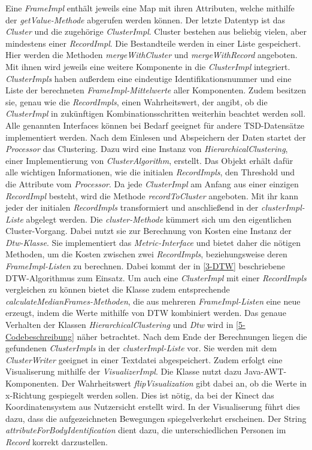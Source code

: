 Eine \emph{FrameImpl} enthält jeweils eine Map mit ihren Attributen,
welche mithilfe der \emph{getValue-Methode} abgerufen werden können.
Der letzte Datentyp ist das \emph{Cluster} und die zugehörige \emph{ClusterImpl}.
Cluster bestehen aus beliebig vielen, aber mindestens einer \emph{RecordImpl}.
Die Bestandteile werden in einer Liste gespeichert.
Hier werden die Methoden \emph{mergeWithCluster} und \emph{mergeWithRecord} angeboten.
Mit ihnen wird jeweils eine weitere Komponente in die \emph{ClusterImpl} integriert.
\emph{ClusterImpls} haben außerdem eine eindeutige Identifikationsnummer und eine Liste der berechneten
\emph{FrameImpl-Mittelwerte} aller Komponenten.
Zudem besitzen sie, genau wie die \emph{RecordImpls}, einen Wahrheitswert, der angibt,
ob die \emph{ClusterImpl} in zukünftigen Kombinationsschritten weiterhin beachtet werden soll.
Alle genannten Interfaces können bei Bedarf geeignet für andere \ac{TSD}-Datensätze implementiert werden.
Nach dem Einlesen und Abspeichern der Daten startet der \emph{Processor} das Clustering.
Dazu wird eine Instanz von \emph{HierarchicalClustering}, einer Implementierung von \emph{ClusterAlgorithm}, erstellt.
Das Objekt erhält dafür alle wichtigen Informationen,
wie die initialen \emph{RecordImpls}, den Threshold und die Attribute vom \emph{Processor}.
Da jede \emph{ClusterImpl} am Anfang aus einer einzigen \emph{RecordImpl} besteht,
wird die Methode \emph{recordToCluster} angeboten.
Mit ihr kann jeder der initialen \emph{RecordImpls} transformiert
und anschließend in der \emph{clusterImpl-Liste} abgelegt werden.
Die \emph{cluster-Methode} kümmert sich um den eigentlichen Cluster-Vorgang.
Dabei nutzt sie zur Berechnung von Kosten eine Instanz der \emph{Dtw-Klasse}.
Sie implementiert das \emph{Metric-Interface} und bietet daher die nötigen Methoden,
um die Kosten zwischen zwei \emph{RecordImpls}, beziehungsweise deren \emph{FrameImpl-Listen} zu berechnen.
Dabei kommt der in \autoref{3-DTW} beschriebene \ac{DTW}-Algorithmus zum Einsatz.
Um auch eine \emph{ClusterImpl} mit einer \emph{RecordImpls} vergleichen zu können bietet die Klasse zudem entsprechende
\emph{calculateMedianFrames-Methoden}, die aus mehreren \emph{FrameImpl-Listen} eine neue erzeugt,
indem die Werte mithilfe von \ac{DTW} kombiniert werden.
Das genaue Verhalten der Klassen \emph{HierarchicalClustering} und \emph{Dtw} wird in \autoref{5-Codebeschreibung} näher betrachtet.
Nach dem Ende der Berechnungen liegen die gefundenen \emph{ClusterImpls} in der \emph{clusterImpl-Liste} vor.
Sie werden mit dem \emph{ClusterWriter} geeignet in einer Textdatei abgespeichert.
Zudem erfolgt eine Visualiserung mithilfe der \emph{VisualizerImpl}.
Die Klasse nutzt dazu Java-AWT-Komponenten.
Der Wahrheitswert \emph{flipVisualization} gibt dabei an,
ob die Werte in x-Richtung gespiegelt werden sollen.
Dies ist nötig, da bei der Kinect das Koordinatensystem aus Nutzersicht erstellt wird.
In der Visualiserung führt dies dazu, dass die aufgezeichneten Bewegungen spiegelverkehrt erscheinen.
Der String \emph{attributeForBodyIdentification} dient dazu,
die unterschiedlichen Personen im \emph{Record} korrekt darzustellen.

